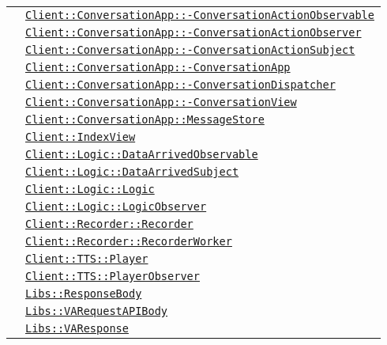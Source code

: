 \begin{longtable}{|>{\centering}m{3cm}|m{10cm}<{\centering}|}
& \hyperref[Client::ConversationApp::ConversationActionObservable]{\texttt{Client::ConversationApp::-\linebreak ConversationActionObservable}}\\
& \hyperref[Client::ConversationApp::ConversationActionObserver]{\texttt{Client::ConversationApp::-\linebreak ConversationActionObserver}}\\
& \hyperref[Client::ConversationApp::ConversationActionSubject]{\texttt{Client::ConversationApp::-\linebreak ConversationActionSubject}}\\
& \hyperref[Client::ConversationApp::ConversationApp]{\texttt{Client::ConversationApp::-\linebreak ConversationApp}}\\
& \hyperref[Client::ConversationApp::ConversationDispatcher]{\texttt{Client::ConversationApp::-\linebreak ConversationDispatcher}}\\
& \hyperref[Client::ConversationApp::ConversationView]{\texttt{Client::ConversationApp::-\linebreak ConversationView}}\\
& \hyperref[Client::ConversationApp::MessageStore]{\texttt{Client::ConversationApp::MessageStore}}\\
& \hyperref[Client::IndexView]{\texttt{Client::IndexView}}\\
& \hyperref[Client::Logic::DataArrivedObservable]{\texttt{Client::Logic::DataArrivedObservable}}\\
& \hyperref[Client::Logic::DataArrivedSubject]{\texttt{Client::Logic::DataArrivedSubject}}\\
& \hyperref[Client::Logic::Logic]{\texttt{Client::Logic::Logic}}\\
& \hyperref[Client::Logic::LogicObserver]{\texttt{Client::Logic::LogicObserver}}\\
& \hyperref[Client::Recorder::Recorder]{\texttt{Client::Recorder::Recorder}}\\
& \hyperref[Client::Recorder::RecorderWorker]{\texttt{Client::Recorder::RecorderWorker}}\\
& \hyperref[Client::TTS::Player]{\texttt{Client::TTS::Player}}\\
& \hyperref[Client::TTS::PlayerObserver]{\texttt{Client::TTS::PlayerObserver}}\\
& \hyperref[Libs::ResponseBody]{\texttt{Libs::ResponseBody}}\\
& \hyperref[Libs::VARequestAPIBody]{\texttt{Libs::VARequestAPIBody}}\\
& \hyperref[Libs::VAResponse]{\texttt{Libs::VAResponse}}\\ \hline


\end{longtable}
